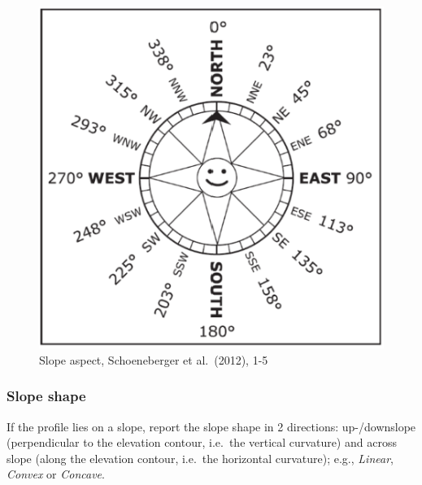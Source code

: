\documentclass[
  letterpaper,
  DIV=11,
  numbers=noendperiod]{scrreprt}
\begin{document}
\begin{figure}

{\centering \includegraphics{./figure_8-7.png}

}

\caption{Slope aspect, Schoeneberger et al.~(2012), 1-5}

\end{figure}

\hypertarget{slope-shape}{%
\subsubsection{Slope shape}\label{slope-shape}}

If the profile lies on a slope, report the slope shape in 2 directions:
up-/downslope (perpendicular to the elevation contour, i.e.~the vertical
curvature) and across slope (along the elevation contour, i.e.~the
horizontal curvature); e.g., \emph{Linear}, \emph{Convex} or
\emph{Concave}.
\end{document}
